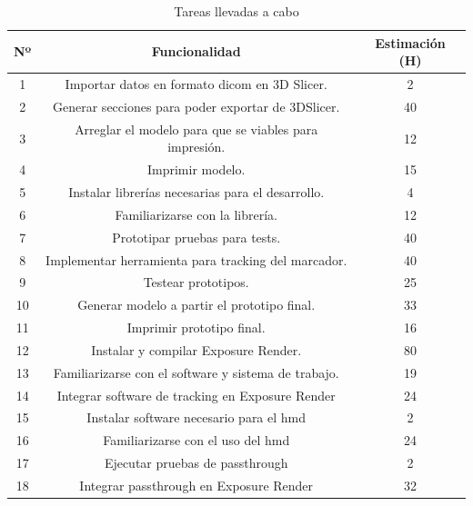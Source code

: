 \begin{table}
  \centering
  \begin{tabular}{c|c|c}
  \rowcolor{udcpink!25}
  \textbf{Nº} & \textbf{Funcionalidad}& \textbf{Estimación (H)} \\\hline
  1     &   Importar datos en formato \acrshort{dicom} en 3D Slicer.    &   2     \\
  2     &   Generar secciones para poder exportar de 3DSlicer.          &   40    \\
  3     &   Arreglar el modelo para que se viables para impresión.      &   12    \\
  4     &   Imprimir modelo.                                            &   15    \\
  5     &   Instalar librerías necesarias para el desarrollo.           &   4     \\
  6     &   Familiarizarse con la librería.                             &   12    \\
  7     &   Prototipar pruebas para tests.                              &   40    \\
  8     &   Implementar herramienta para tracking del marcador.         &   40    \\  
  9     &   Testear prototipos.                                         &   25    \\
  10    &   Generar modelo a partir el prototipo final.                 &   33    \\
  11    &   Imprimir prototipo final.                                   &   16    \\
  12    &   Instalar y compilar Exposure Render.                        &   80    \\
  13    &   Familiarizarse con el software y sistema de trabajo.        &   19    \\
  14    &   Integrar software de tracking en Exposure Render            &   24    \\
  15    &   Instalar software necesario para el \acrshort{hmd}          &   2     \\
  16    &   Familiarizarse con el uso del \acrshort{hmd}                &   24    \\
  17    &   Ejecutar pruebas de passthrough                             &   2     \\
  18    &   Integrar passthrough en Exposure Render                     &   32    \\
  
  \end{tabular}
  \caption{Tareas llevadas a cabo}
  \label{tab:tareas}
\end{table}


